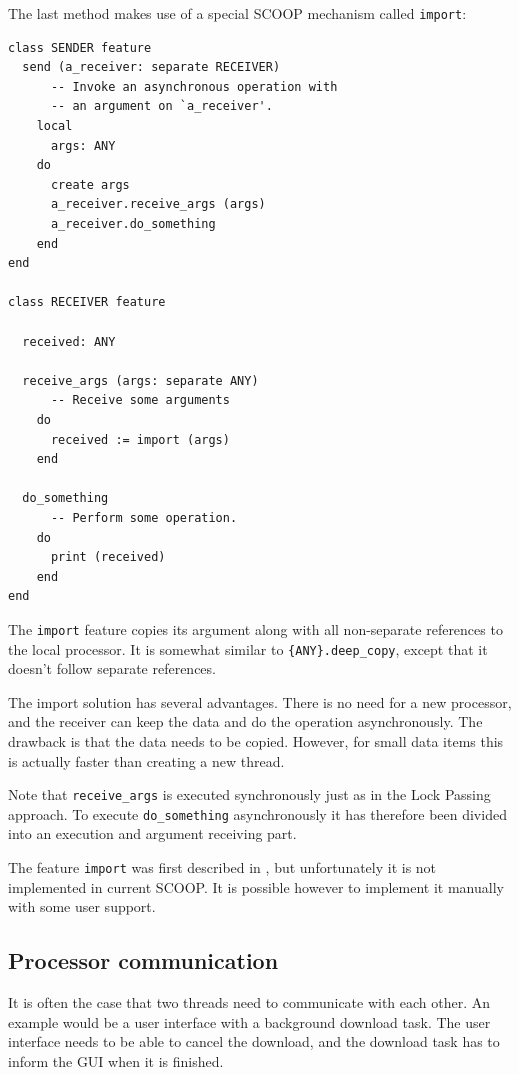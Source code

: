 \documentclass[a4paper,10pt,titlepage]{article}
\begin{document}
The last method makes use of a special SCOOP mechanism called \lstinline!import!:
\begin{lstlisting}[language=OOSC2Eiffel, captionpos=b, caption={Migrate objects with import.}]
class SENDER feature
  send (a_receiver: separate RECEIVER)
      -- Invoke an asynchronous operation with
      -- an argument on `a_receiver'.
    local
      args: ANY
    do
      create args
      a_receiver.receive_args (args)
      a_receiver.do_something
    end
end

class RECEIVER feature
  
  received: ANY
  
  receive_args (args: separate ANY)
      -- Receive some arguments
    do
      received := import (args)
    end

  do_something
      -- Perform some operation.
    do
      print (received)
    end
end
\end{lstlisting}
The \lstinline!import! feature copies its argument along with all non-separate references to the local processor.
It is somewhat similar to \lstinline!{ANY}.deep_copy!, except that it doesn't follow separate references.

The import solution has several advantages.
There is no need for a new processor, and the receiver can keep the data and do the operation asynchronously.
The drawback is that the data needs to be copied.
However, for small data items this is actually faster than creating a new thread.

Note that \lstinline!receive_args! is executed synchronously just as in the Lock Passing approach.
To execute \lstinline!do_something! asynchronously it has therefore been divided into an execution and argument receiving part.

The feature \lstinline!import! was first described in \cite[p. 106]{Nienaltowski07}, but unfortunately it is not implemented in current SCOOP.
It is possible however to implement it manually with some user support.

\subsection{Processor communication}
\label{sec:processor-communication}

It is often the case that two threads need to communicate with each other.
An example would be a user interface with a background download task.
The user interface needs to be able to cancel the download, and the download task has to inform the GUI when it is finished.
\end{document}
